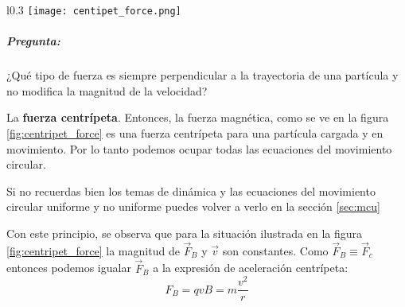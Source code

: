 \begin{wrapfigure}{l}{0.3\textwidth}
  \centering
  \texttt{[image: centipet\_force.png]}
  \caption{Fuerza magnética para una partícula con velocidad \(v\) y un campo magnético entrante.}
  \label{fig:centripet_force}
\end{wrapfigure}
\subparagraph{Pregunta:}

\noindent ¿Qué tipo de fuerza es siempre perpendicular a la trayectoria de una partícula y no modifica la magnitud de la velocidad?

\vspace{3pt}

\noindent La \textbf{fuerza centrípeta}. Entonces, la fuerza magnética, como se ve en la figura \ref{fig:centripet_force} es una fuerza centrípeta para una partícula cargada y en movimiento. Por lo tanto podemos ocupar todas las ecuaciones del movimiento circular.

Si no recuerdas bien los temas de dinámica y las ecuaciones del movimiento circular uniforme y no uniforme puedes volver a verlo en la sección \ref{sec:mcu}

Con este principio, se observa que para la situación ilustrada en la figura \ref{fig:centripet_force} la magnitud de \(\vec{F}_B\) y \(\vec{v}\) son constantes. Como \(\vec{F}_B \equiv \vec{F}_c\) entonces podemos igualar \(\vec{F}_B\) a la expresión de aceleración centrípeta:
\[
  F_B = qvB = m \frac{v^2}{r}
\]